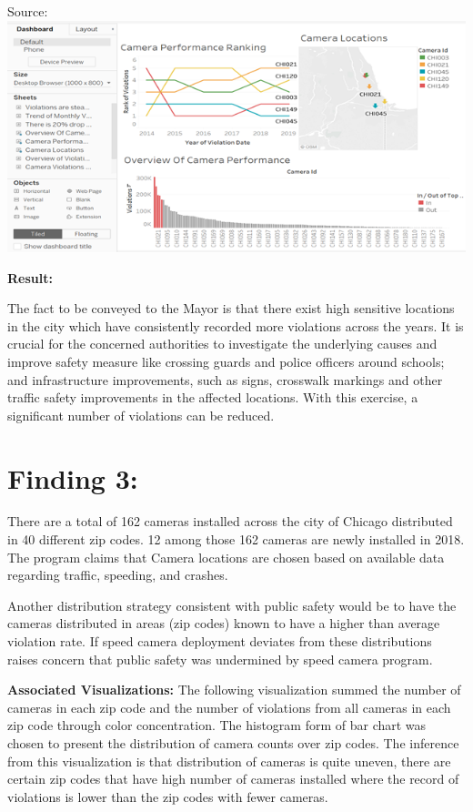 \documentclass[]{book}
\begin{document}
Source:\citep{tableau}
\includegraphics{images/Image8.png}

\textbf{Result:}

The fact to be conveyed to the Mayor is that there exist high sensitive locations in the city which have consistently recorded more violations across the years. It is crucial for the concerned authorities to investigate the underlying causes and improve safety measure like crossing guards and police officers around schools; and infrastructure improvements, such as signs, crosswalk markings and other traffic safety improvements in the affected locations. With this exercise, a significant number of violations can be reduced.

\hypertarget{finding-3}{%
\section{Finding 3:}\label{finding-3}}

There are a total of 162 cameras installed across the city of Chicago distributed in 40 different zip codes. 12 among those 162 cameras are newly installed in 2018. The program claims that Camera locations are chosen based on available data regarding traffic, speeding, and crashes.

Another distribution strategy consistent with public safety would be to have the cameras distributed in areas (zip codes) known to have a higher than average violation rate. If speed camera deployment deviates from these distributions raises concern that public safety was undermined by speed camera program.

\textbf{Associated Visualizations:}
The following visualization summed the number of cameras in each zip code and the number of violations from all cameras in each zip code through color concentration. The histogram form of bar chart was chosen to present the distribution of camera counts over zip codes. The inference from this visualization is that distribution of cameras is quite uneven, there are certain zip codes that have high number of cameras installed where the record of violations is lower than the zip codes with fewer cameras.
\end{document}
